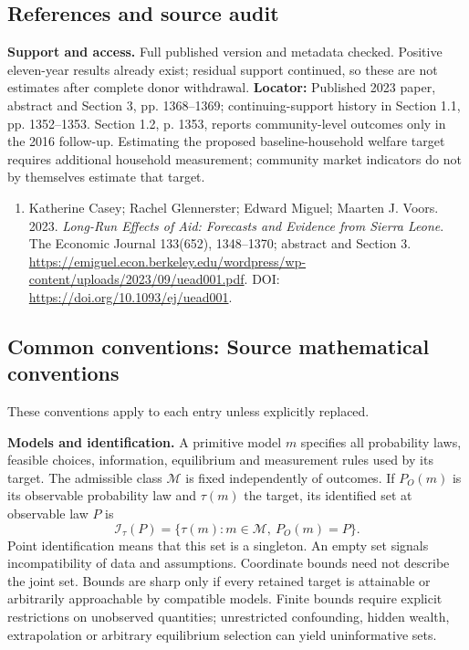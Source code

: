 \documentclass[11pt,a4paper]{article}
\begin{document}
\subsection*{References and source audit}
\textbf{Support and access.} Full published version and metadata checked. Positive eleven-year results already exist; residual support continued, so these are not estimates after complete donor withdrawal. \textbf{Locator:} Published 2023 paper, abstract and Section 3, pp. 1368--1369; continuing-support history in Section 1.1, pp. 1352--1353. Section 1.2, p. 1353, reports community-level outcomes only in the 2016 follow-up. Estimating the proposed baseline-household welfare target requires additional household measurement; community market indicators do not by themselves estimate that target.
\begin{enumerate}\raggedright
\item\hypertarget{definitions:source:30007657:1}{} Katherine Casey; Rachel Glennerster; Edward Miguel; Maarten J. Voors. 2023. \emph{Long-Run Effects of Aid: Forecasts and Evidence from Sierra Leone}. The Economic Journal 133(652), 1348--1370; abstract and Section 3.
\url{https://emiguel.econ.berkeley.edu/wordpress/wp-content/uploads/2023/09/uead001.pdf}.
DOI: \url{https://doi.org/10.1093/ej/uead001}.
\end{enumerate}

\subsection*{Common conventions: Source mathematical conventions}

These conventions apply to each entry unless explicitly replaced.

\textbf{Models and identification.} A primitive model \(m\) specifies all probability laws, feasible choices, information, equilibrium and measurement rules used by its target. The admissible class \(\mathcal M\) is fixed independently of outcomes. If \(P_O(m)\) is its observable probability law and \(\tau(m)\) the target, its identified set at observable law \(P\) is
\[
 \mathcal I_\tau(P)=\{\tau(m):m\in\mathcal M,\ P_O(m)=P\}.
\]
Point identification means that this set is a singleton. An empty set signals incompatibility of data and assumptions. Coordinate bounds need not describe the joint set. Bounds are sharp only if every retained target is attainable or arbitrarily approachable by compatible models. Finite bounds require explicit restrictions on unobserved quantities; unrestricted confounding, hidden wealth, extrapolation or arbitrary equilibrium selection can yield uninformative sets.
\end{document}
